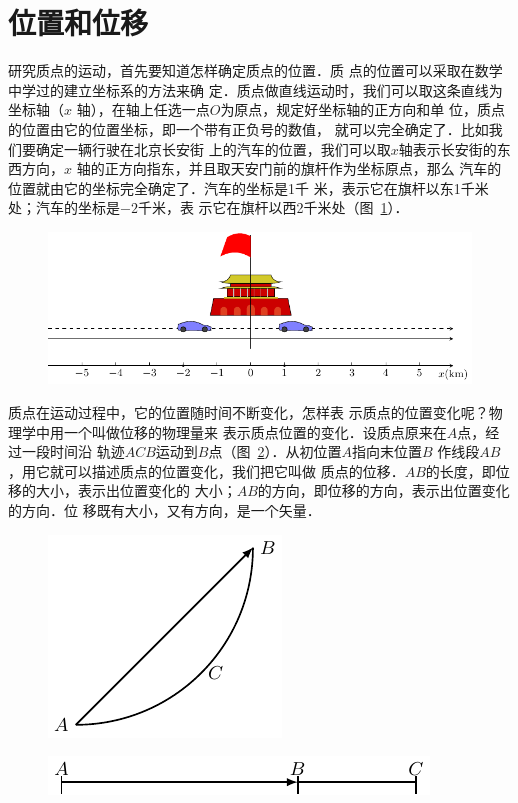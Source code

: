 \section{位置和位移}
    研究质点的运动，首先要知道怎样确定质点的位置．质
点的位置可以采取在数学中学过的建立坐标系的方法来确
定．质点做直线运动时，我们可以取这条直线为坐标轴（$x$
轴），在轴上任选一点$O$为原点，规定好坐标轴的正方向和单
位，质点的位置由它的位置坐标，即一个带有正负号的数值，
就可以完全确定了．比如我们要确定一辆行驶在北京长安街
上的汽车的位置，我们可以取$x$轴表示长安街的东西方向，$x$
轴的正方向指东，并且取天安门前的旗杆作为坐标原点，那么
汽车的位置就由它的坐标完全确定了．汽车的坐标是1千
米，表示它在旗杆以东1千米处；汽车的坐标是$-2$千米，表
示它在旗杆以西2千米处（图~\ref{fig_A_2-4}）．
\begin{figure}[htp]
    \centering
    \includegraphics{fig/A/2-4.pdf}
    \caption{}\label{fig_A_2-4}
\end{figure}

    质点在运动过程中，它的位置随时间不断变化，怎样表
示质点的位置变化呢？物理学中用一个叫做位移的物理量来
表示质点位置的变化．设质点原来在$A$点，经过一段时间沿
轨迹$ACB$运动到$B$点（图~\ref{fig_A_2-5}）．从初位置$A$指向末位置$B$
作线段$AB$，用它就可以描述质点的位置变化，我们把它叫做
质点的位移．$AB$的长度，即位移的大小，表示出位置变化的
大小；$AB$的方向，即位移的方向，表示出位置变化的方向．位
移既有大小，又有方向，是一个矢量．

\begin{figure}[htp]
    \centering
    \includegraphics{fig/A/2-5.pdf}
    \caption{}\label{fig_A_2-5}
\end{figure}
\begin{figure}[htp]
    \centering
    \includegraphics{fig/A/2-6.pdf}
    \caption{}\label{fig_A_2-6}
\end{figure}

